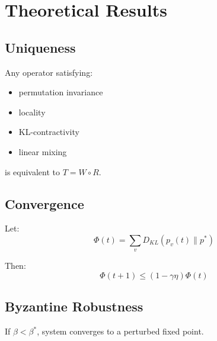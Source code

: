 \section{Theoretical Results}

\subsection{Uniqueness}

Any operator satisfying:
\begin{itemize}
\item permutation invariance
\item locality
\item KL-contractivity
\item linear mixing
\end{itemize}

is equivalent to $T = W \circ R$.

\subsection{Convergence}

Let:
\[
\Phi(t) = \sum_v D_{KL}(p_v(t) \| p^*)
\]

Then:
\[
\Phi(t+1) \leq (1 - \gamma \eta)\Phi(t)
\]

\subsection{Byzantine Robustness}

If $\beta < \beta^*$, system converges to a perturbed fixed point.
